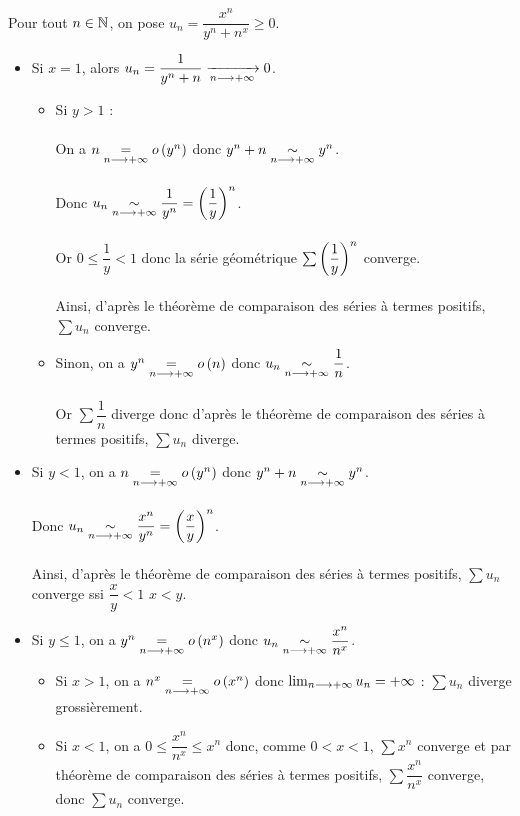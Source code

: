 \begin{corr}
Pour tout \(n\in\mathbb{N}\), on pose \(u_n=\dfrac{x^n}{y^n+n^x}\geq0\).

\begin{itemize}
    \item Si \(x=1\), alors \(u_n=\dfrac{1}{y^n+n}\xrightarrow[n\longrightarrow+\infty]{}0\). \\ \begin{itemize}
        \item Si \(y>1\) : \\\\ On a \(n\underset{n\longrightarrow+\infty}{=}o\left(y^n\right)\) donc \(y^n+n\underset{n\longrightarrow+\infty}{\sim}y^n\). \\\\ Donc \(u_n\underset{n\longrightarrow+\infty}{\sim}\dfrac{1}{y^n}=\left(\dfrac{1}{y}\right)^n\). \\\\ Or \(0\leq\dfrac{1}{y}<1\) donc la série géométrique \(\sum\left(\dfrac{1}{y}\right)^n\) converge. \\\\ Ainsi, d'après le théorème de comparaison des séries à termes positifs, \(\sum u_n\) converge. \\
        \item Sinon, on a \(y^n\underset{n\longrightarrow+\infty}{=}o\left(n\right)\) donc \(u_n\underset{n\longrightarrow+\infty}{\sim}\dfrac{1}{n}\). \\\\ Or \(\sum\dfrac{1}{n}\) diverge donc d'après le théorème de comparaison des séries à termes positifs, \(\sum u_n\) diverge. \\
    \end{itemize}
    \item Si \(y<1\), on a \(n\underset{n\longrightarrow+\infty}{=}o\left(y^n\right)\) donc \(y^n+n\underset{n\longrightarrow+\infty}{\sim}y^n\). \\\\ Donc \(u_n\underset{n\longrightarrow+\infty}{\sim}\dfrac{x^n}{y^n}=\left(\dfrac{x}{y}\right)^n\). \\\\ Ainsi, d'après le théorème de comparaison des séries à termes positifs, \(\sum u_n\) converge ssi \(\dfrac{x}{y}<1\) \ie \(x<y\). \\
    \item Si \(y\leq1\), on a \(y^n\underset{n\longrightarrow+\infty}{=}o\left(n^x\right)\) donc \(u_n\underset{n\longrightarrow+\infty}{\sim}\dfrac{x^n}{n^x}\). \\ \begin{itemize}
        \item Si \(x>1\), on a \(n^x\underset{n\longrightarrow+\infty}{=}o\left(x^n\right)\) donc \(\lim_{n\longrightarrow+\infty}u_n=+\infty\) : \(\sum u_n\) diverge grossièrement. \\
        \item Si \(x<1\), on a \(0\leq\dfrac{x^n}{n^x}\leq x^n\) donc, comme \(0<x<1\), \(\sum x^n\) converge et par théorème de comparaison des séries à termes positifs, \(\sum\dfrac{x^n}{n^x}\) converge, donc \(\sum u_n\) converge.
    \end{itemize}
\end{itemize}


\end{corr}
